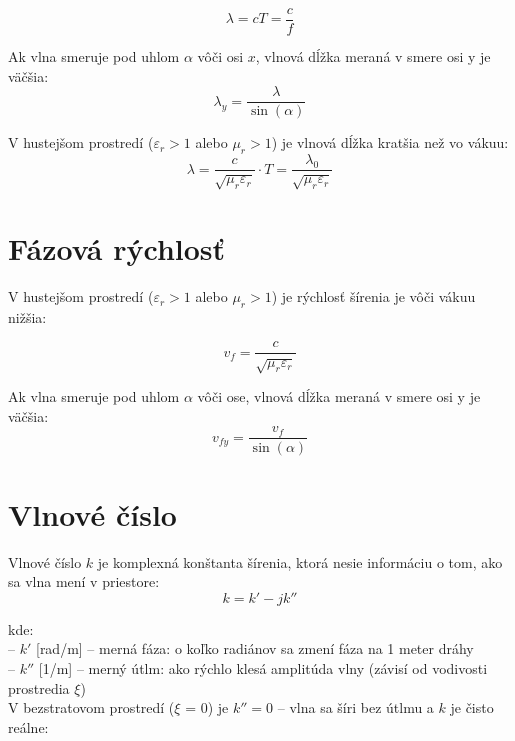 \begin{equation}
	\lambda = c T = \frac{c}{f}
\end{equation}

Ak vlna smeruje pod uhlom $\alpha$ vôči osi $x$, vlnová dĺžka meraná v smere osi y je väčšia:
\begin{equation}
	\lambda_y = \frac{\lambda}{\sin(\alpha)}
\end{equation}

V hustejšom prostredí ($\varepsilon_r > 1$ alebo $\mu_r > 1$) je vlnová dĺžka kratšia než vo vákuu:
\begin{equation}
	\lambda = \frac{c}{\sqrt{\mu_r \varepsilon_r}} \cdot T = \frac{\lambda_0}{\sqrt{\mu_r \varepsilon_r}}
\end{equation}

\section{Fázová rýchlosť}

V hustejšom prostredí ($\varepsilon_r > 1$ alebo $\mu_r > 1$) je rýchlosť šírenia je vôči vákuu nižšia:

\begin{equation}
	v_f = \frac{c}{\sqrt{\mu_r \varepsilon_r}}
\end{equation}

Ak vlna smeruje pod uhlom $\alpha$ vôči ose, vlnová dĺžka meraná v smere osi y je väčšia:
\begin{equation}
	v_{fy} = \frac{v_f}{\sin(\alpha)}
\end{equation}


\section{Vlnové číslo}

Vlnové číslo $k$ je komplexná konštanta šírenia, ktorá nesie informáciu o tom, ako sa vlna mení v priestore:
\begin{equation}
	k = k' - jk''
\end{equation}

kde:\\
-- $k'$ [rad/m] -- merná fáza: o koľko radiánov sa zmení fáza na 1 meter dráhy\\
-- $k''$ [1/m] -- merný útlm: ako rýchlo klesá amplitúda vlny (závisí od vodivosti prostredia $\xi$)\\
\medskip
V bezstratovom prostredí ($\xi$ = 0) je $k'' = 0$ -- vlna sa šíri bez útlmu a $k$ je čisto reálne:

